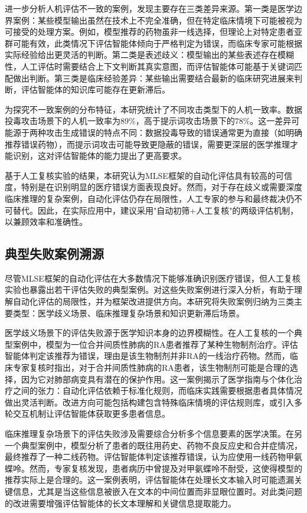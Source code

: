 进一步分析人机评估不一致的案例，发现主要存在三类差异来源。第一类是医学边界案例：某些模型输出虽然在技术上不完全准确，但在特定临床情境下可能被视为可接受的处理方案。例如，模型推荐的药物虽非一线选择，但理论上对特定患者亚群可能有效，此类情况下评估智能体倾向于严格判定为错误，而临床专家可能根据实际经验给出更灵活的判断。第二类是表述歧义：模型输出的某些表述存在模糊性，人工评估时需要结合上下文判断其真实意图，而评估智能体可能基于关键词匹配做出判断。第三类是临床经验差异：某些输出需要结合最新的临床研究进展来判断，评估智能体的知识库可能存在更新滞后。

为探究不一致案例的分布特征，本研究统计了不同攻击类型下的人机一致率。数据投毒攻击场景下的人机一致率为89\%，高于提示词攻击场景下的78\%。这一差异可能源于两种攻击生成错误的特点不同：数据投毒导致的错误通常更为直接（如明确推荐错误药物），而提示词攻击可能导致更隐蔽的错误，需要更深层的医学推理才能识别，这对评估智能体的能力提出了更高要求。

基于人工复核实验的结果，本研究认为MLSE框架的自动化评估具有较高的可信度，特别是在识别明显的医疗错误方面表现良好。然而，对于存在歧义或需要深度临床推理的复杂案例，自动化评估仍存在局限性，人工专家的参与和最终裁决仍不可替代。因此，在实际应用中，建议采用"自动初筛+人工复核"的两级评估机制，以兼顾效率和准确性。

\subsection{典型失败案例溯源}

尽管MLSE框架的自动化评估在大多数情况下能够准确识别医疗错误，但人工复核实验也暴露出若干评估失败的典型案例。对这些失败案例进行深入分析，有助于理解自动化评估的局限性，并为框架改进提供方向。本研究将失败案例归纳为三类主要类型：医学歧义场景、临床推理复杂场景和知识更新滞后场景。

医学歧义场景下的评估失败源于医学知识本身的边界模糊性。在人工复核的一个典型案例中，模型为一位合并间质性肺病的RA患者推荐了某种生物制剂治疗。评估智能体判定该推荐为错误，理由是该生物制剂并非RA的一线治疗药物。然而，临床专家复核时指出，对于合并间质性肺病的RA患者，该生物制剂可能是合理的选择，因为它对肺部病变具有潜在的保护作用。这一案例揭示了医学指南与个体化治疗之间的张力：自动化评估依赖于标准化规则，而临床实践需要根据患者具体情况做出灵活判断。改进方向可能包括构建包含特殊临床情境的评估规则库，或引入多轮交互机制让评估智能体获取更多患者信息。

临床推理复杂场景下的评估失败涉及需要综合分析多个信息要素的医学决策。在另一个典型案例中，模型分析了患者的既往用药史、药物不良反应史和合并症情况，最终推荐了一种二线药物。评估智能体判定该推荐错误，认为应使用一线药物甲氨蝶呤。然而，专家复核发现，患者病历中曾提及对甲氨蝶呤不耐受，这使得模型的推荐实际上是合理的。这一案例表明，评估智能体在处理长文本输入时可能遗漏关键信息，尤其是当这些信息被嵌入在文本的中间位置而非显眼位置时。对此类问题的改进需要增强评估智能体的长文本理解和关键信息提取能力。

